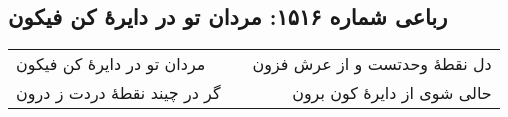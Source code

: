 \begin{center}
\section*{رباعی شماره ۱۵۱۶: مردان تو در دایرهٔ کن فیکون}
\label{sec:1516}
\begin{longtable}{l p{0.5cm} r}
مردان تو در دایرهٔ کن فیکون
&&
دل نقطهٔ وحدتست و از عرش فزون
\\
گر در چیند نقطهٔ دردت ز درون
&&
حالی شوی از دایرهٔ کون برون
\\
\end{longtable}
\end{center}
